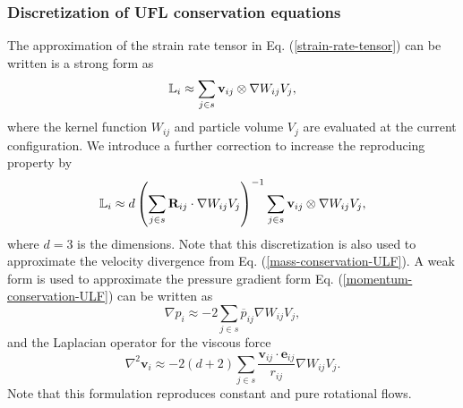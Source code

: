 \documentclass[12pt, a4paper,onecolumn]{article}
\begin{document}
\subsubsection{Discretization of UFL conservation equations}
%
The approximation of
the strain rate tensor in Eq. (\ref{strain-rate-tensor})
can be written is a strong form as
%
\begin{equation}\label{sph-strain-rate-tensor}
\mathbb{L}_i \approx   \sum_{j\in s} \bold{v}_{ij} \otimes \nabla W_{ij}  V_j,
\end{equation}
%
where the kernel function $ W_{ij}$ and particle volume $V_j$ are evaluated at the current configuration.
We introduce a further correction to increase the reproducing property by
 \begin{equation}\label{sph-strain-rate-tensor-corrected}
 \mathbb{L}_i \approx  d \left(\sum_{j\in s} \bold{R}_{ij} \cdot \nabla W_{ij}  V_j\right)^{-1} \sum_{j\in s} \bold{v}_{ij} \otimes \nabla W_{ij}  V_j,
 \end{equation}
where $d=3$ is the dimensions.
Note that this discretization is also used to approximate the velocity divergence from Eq. (\ref{mass-conservation-ULF}).
A weak form is used to approximate the pressure gradient form Eq. (\ref{momentum-conservation-ULF}) can be written as
%
\begin{equation}
\label{eq:surface-integral}
\nabla p_i \approx 
-2 \sum_{j\in s}  \overline{p}_{ij} \nabla W_{ij} V_j,
\end{equation}
%
and the Laplacian operator for the viscous force
%
\begin{equation}
\label{eq:gradsph-weak-Laplacian}
\nabla^2 \mathbf{v}_i \approx  
-2(d+2)\sum_{j\in s}\frac{\mathbf{v}_{ij}\cdot \mathbf{e}_{ij}}{r_{ij}} \nabla W_{ij}  V_j. 
\end{equation}
%
Note that this formulation reproduces constant and pure rotational flows.
%
\end{document}
